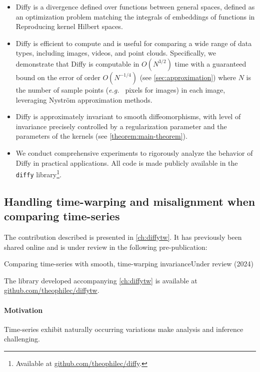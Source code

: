 \begin{itemize}
    \item Diffy is a divergence defined over functions between general spaces, defined as an optimization problem matching the integrals of embeddings of functions in Reproducing kernel Hilbert spaces.
    \item Diffy is efficient to compute and is useful for comparing a wide range of data types, including images, videos, and point clouds. Specifically, we demonstrate that Diffy is computable in $O(N^{3/2})$ time with a guaranteed bound on the error of order $O(N^{-1/4})$ (see \cref{sec:approximation}) where $N$ is the number of sample points (\emph{e.g.\ } pixels for images) in each image, leveraging Nyström approximation methods.
    \item Diffy is approximately invariant to smooth diffeomorphisms, with level of invariance precisely controlled by a regularization parameter and the parameters of the kernels (see \cref{theorem:main-theorem}).
    \item We conduct comprehensive experiments to rigorously analyze the behavior of Diffy in practical applications. All code is made publicly available in the \texttt{diffy} library\footnote{Available at \url{github.com/theophilec/diffy}.}.
\end{itemize}

\subsection{Handling time-warping and misalignment when comparing time-series}
\begin{mdframed}
The contribution described is presented in \cref{ch:diffytw}.
\noindent It has previously been shared online and is under review in the following pre-publication:
\begin{mdframed}
{Comparing time-series with smooth, time-warping invariance}{Under review (2024)}
\end{mdframed}
The library developed accompanying \cref{ch:diffytw} is available at \url{github.com/theophilec/diffytw}.
\end{mdframed}
\paragraph{Motivation}
Time-series exhibit naturally occurring variations make analysis and inference challenging.

